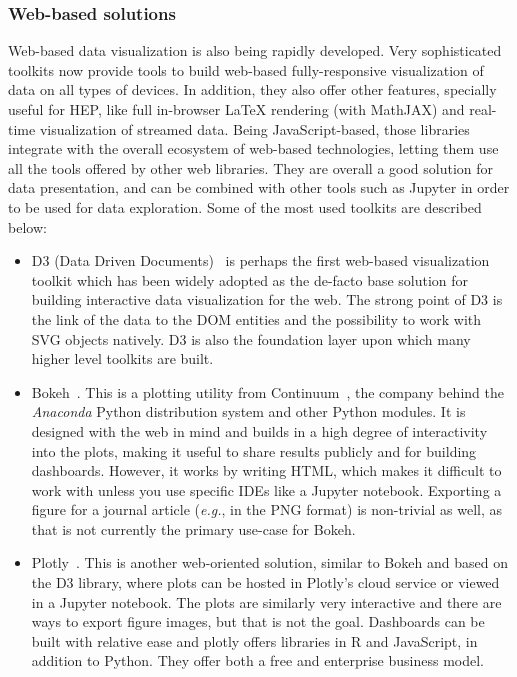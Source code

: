 \documentclass[12pt,a4paper]{article}
\begin{document}
\hypertarget{stats-web}{%
\subsubsection{Web-based solutions}\label{stats-web}}

Web-based data visualization is also being rapidly developed. Very sophisticated toolkits now provide tools to build web-based
fully-responsive visualization of data on all types of devices. In addition, they also offer other features, specially useful
for HEP, like full in-browser LaTeX rendering (with MathJAX) and real-time visualization of streamed data. Being JavaScript-based,
those libraries integrate with the overall ecosystem of web-based technologies, letting them use all the tools offered by other
web libraries. They are overall a good solution for data presentation, and can be combined with other tools such as Jupyter
in order to be used for data exploration. Some of the most used toolkits are described below:

\begin{itemize}
\item D3 (Data Driven Documents)~\cite{D32011} is perhaps the first web-based visualization toolkit which has been widely
adopted as the de-facto base solution for building interactive data visualization for the web. The strong point of D3 is the
link of the data to the DOM entities and the possibility to work with SVG objects natively. D3 is also the foundation layer
upon which many higher level toolkits are built.

\item Bokeh~\cite{Bokeh2014}. This is a plotting utility from Continuum~\cite{continuum}, the company behind the
\textit{Anaconda} Python distribution system and other Python modules. It is designed with the web in mind and builds in a high degree of
interactivity into the plots, making it useful to share results publicly and for building dashboards. However, it works by
writing HTML, which makes it difficult to work with unless you use specific IDEs like a Jupyter notebook. Exporting a figure
for a journal article ({\it e.g.}, in the PNG format) is non-trivial as well, as that is not currently the primary use-case for Bokeh.

\item Plotly~\cite{Plotly2015}. This is another web-oriented solution, similar to Bokeh and based on the D3 library, where plots
can be hosted in Plotly’s cloud service or viewed in a Jupyter notebook. The plots are similarly very interactive and there
are ways to export figure images, but that is not the goal. Dashboards can be built with relative ease and plotly offers
libraries in R and JavaScript, in addition to Python. They offer both a free and enterprise business model.
\end{itemize}
\end{document}
